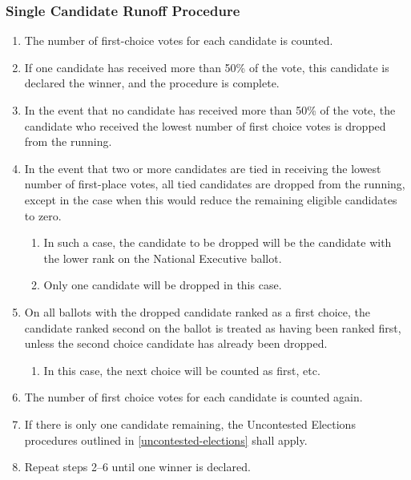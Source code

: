 \subsubsection{Single Candidate Runoff Procedure}
\label{single-candidate-runoff-procedure}

\begin{enumerate}
 \item
  The number of first-choice votes for each candidate is counted.
 \item
  If one candidate has received more than 50\% of the vote, this candidate is declared the winner, and the procedure is complete.
 \item
  In the event that no candidate has received more than 50\% of the vote, the candidate who received the lowest number of first choice votes is dropped from the running.
 \item
  In the event that two or more candidates are tied in receiving the lowest number of first-place votes, all tied candidates are dropped from the running, except in the case when this would reduce the remaining eligible candidates to zero.

  \begin{enumerate}
   \item
    In such a case, the candidate to be dropped will be the candidate with the lower rank on the National Executive ballot.
   \item
    Only one candidate will be dropped in this case.
  \end{enumerate}

 \item
  On all ballots with the dropped candidate ranked as a first choice, the candidate ranked second on the ballot is treated as having been ranked first, unless the second choice candidate has already been dropped.

  \begin{enumerate}
   \item
    In this case, the next choice will be counted as first, etc.
  \end{enumerate}

 \item
  The number of first choice votes for each candidate is counted again.
 \item
  If there is only one candidate remaining, the Uncontested Elections procedures outlined in \ref{uncontested-elections} shall apply.
 \item
  Repeat steps 2–6 until one winner is declared.
\end{enumerate}

